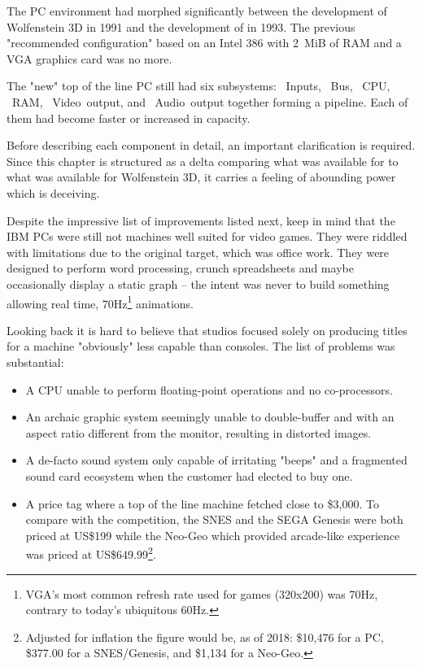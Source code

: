 The PC environment had morphed significantly between the development of Wolfenstein 3D in 1991 and the development of \doom{} in 1993. The previous "recommended configuration" based on an Intel 386 with 2~MiB of RAM and a VGA graphics card was no more.\\
\par
The "new" top of the line PC still had six subsystems: ~Inputs, ~Bus, ~CPU, ~RAM, ~Video~output, and ~Audio~output together forming a pipeline. Each of them had become faster or increased in capacity.\\
\par
\vspace{2mm}
\par
 Before describing each component in detail, an important clarification is required. Since this chapter is structured as a delta comparing what was available for \doom{} to what was available for Wolfenstein 3D, it carries a feeling of abounding power which is deceiving. \\
 \par
 Despite the impressive list of improvements listed next, keep in mind that the IBM PCs were still not machines well suited for video games. They were riddled with limitations due to the original target, which was office work. They were designed to perform word processing, crunch spreadsheets and maybe occasionally display a static graph -- the intent was never to build something allowing real time, 70Hz\footnote{VGA's most common refresh rate used for games (320x200) was 70Hz, contrary to today's ubiquitous 60Hz.} animations.\\ 
\par 
Looking back it is hard to believe that studios focused solely on producing titles for a machine "obviously" less capable than consoles. The list of problems was substantial:
\begin{itemize}
\item A CPU unable to perform floating-point operations and no co-processors.
\item An archaic graphic system seemingly unable to double-buffer and with an aspect ratio different from the monitor, resulting in distorted images.
\item A de-facto sound system only capable of irritating "beeps" and a fragmented sound card ecosystem when the customer had elected to buy one.
\item A price tag where a top of the line machine fetched close to \$3,000. To compare with the competition, the SNES and the SEGA Genesis were both priced at US\$199 while the Neo-Geo which provided arcade-like experience was priced at US\$649.99\footnote{Adjusted for inflation the figure would be, as of 2018: \$10,476 for a PC, \$377.00 for a SNES/Genesis, and \$1,134 for a Neo-Geo.}.
\end{itemize}
